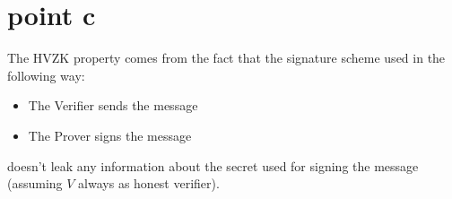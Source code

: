 \begin{figure}[h!]
    \centering
    \sdinit{}
\end{figure}

\newpage
\section{point c}

The HVZK property comes from the fact that the signature scheme used in the following way:

\begin{itemize}
    \item The Verifier sends the message
    \item The Prover signs the message
\end{itemize} 

doesn't leak any information about the secret used for signing the message (assuming $V$ always as honest verifier). 